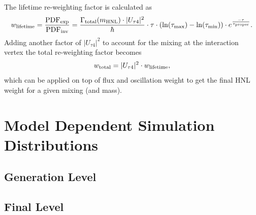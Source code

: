 The lifetime re-weighting factor is calculated as
\begin{equation}
    w_\mathrm{lifetime} = \frac{\mathrm{PDF}_\mathrm{exp}}{\mathrm{PDF}_\mathrm{inv}} = \frac{\Gamma_\mathrm{total}(m_\mathrm{HNL}) \cdot |U_{\tau4}|^2}{\hbar} \cdot \tau \cdot (\ln(\tau_\mathrm{max}) - \ln(\tau_\mathrm{min})) \cdot e^{\frac{-\tau}{\tau_\mathrm{proper}}}.
    \labeq{weight_lifetime}
\end{equation}
Adding another factor of $|U_{\tau4}|^2$ to account for the mixing at the interaction vertex the total re-weighting factor becomes
\begin{equation}
    w_\mathrm{total} = |U_{\tau4}|^2 \cdot w_\mathrm{lifetime},
    \labeq{weight_full}
\end{equation}
which can be applied on top of flux and oscillation weight to get the final HNL weight for a given mixing (and mass).

\section{Model Dependent Simulation Distributions}

\subsection{Generation Level}

\subsection{Final Level}
